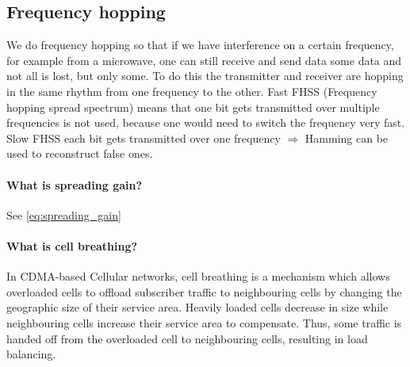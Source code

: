 \subsection{Frequency hopping}
We do frequency hopping so that if we have interference on a certain frequency, for example from a microwave, one can still receive and send data some data and not all is lost, but only some. To do this the transmitter and receiver are hopping in the same rhythm from one frequency to the other. Fast FHSS (Frequency hopping spread spectrum) means that one bit gets transmitted over multiple frequencies is not used, because one would need to switch the frequency very fast. Slow FHSS each bit gets transmitted over one frequency $\Rightarrow$ Hamming can be used to reconstruct false ones.

\paragraph{What is spreading gain?}\mbox{} \newline
See \autoref{eq:spreading_gain}
\paragraph{What is cell breathing?}\mbox{} \newline
In CDMA-based Cellular networks, cell breathing is a mechanism which allows overloaded cells to offload subscriber traffic to neighbouring cells by changing the geographic size of their service area. Heavily loaded cells decrease in size while neighbouring cells increase their service area to compensate. Thus, some traffic is handed off from the overloaded cell to neighbouring cells, resulting in load balancing.
